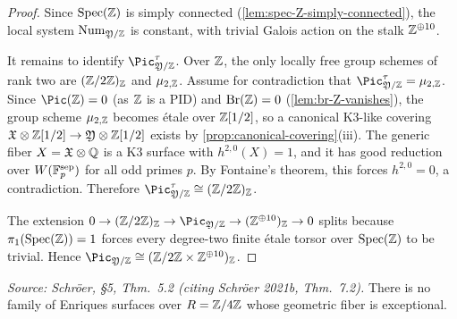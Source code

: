 \begin{proof}
  Since \(\mathrm{Spec}(\mathbb{Z})\) is simply connected (\cref{lem:spec-Z-simply-connected}), the local system
  \(\mathrm{Num}_{\mathfrak{Y}/\mathbb{Z}}\) is constant, with trivial Galois action on the stalk \(\mathbb{Z}^{\oplus 10}\).

  It remains to identify \(\Pic^{\tau}_{\foY/\ZZ}\).
  Over \(\mathbb{Z}\), the only locally free group schemes of rank two are \((\mathbb{Z}/2\mathbb{Z})_{\mathbb{Z}}\) and \(\mu_{2,\mathbb{Z}}\).
  Assume for contradiction that \(\Pic^{\tau}_{\foY/\ZZ} = \mu_{2,\ZZ}\).
  Since \(\Pic(\ZZ) = 0\) (as \(\mathbb{Z}\) is a PID) and \(\operatorname{Br}(\mathbb{Z}) = 0\) (\cref{lem:br-Z-vanishes}),
  the group scheme \(\mu_{2,\mathbb{Z}}\) becomes \'etale over \(\mathbb{Z}[1/2]\), so a canonical K3-like covering
  \(\mathfrak{X} \otimes \mathbb{Z}[1/2] \to \mathfrak{Y} \otimes \mathbb{Z}[1/2]\) exists by \cref{prop:canonical-covering}(iii).
  The generic fiber \(X = \mathfrak{X} \otimes \mathbb{Q}\) is a K3 surface with \(h^{2,0}(X) = 1\),
  and it has good reduction over \(W(\mathbb{F}_p^{\mathrm{sep}})\) for all odd primes \(p\).
  By Fontaine's theorem, this forces \(h^{2,0} = 0\), a contradiction.
  Therefore \(\Pic^{\tau}_{\foY/\ZZ} \cong (\ZZ/2\ZZ)_{\ZZ}\).

  The extension \(0 \to (\ZZ/2\ZZ)_{\ZZ} \to \Pic_{\foY/\ZZ} \to (\ZZ^{\oplus 10})_{\ZZ} \to 0\)
  splits because \(\pi_1(\mathrm{Spec}(\mathbb{Z})) = 1\) forces every degree-two finite étale torsor over \(\mathrm{Spec}(\mathbb{Z})\)
  to be trivial.
  Hence \(\Pic_{\foY/\ZZ} \cong (\ZZ/2\ZZ \times \ZZ^{\oplus 10})_{\ZZ}\).
\end{proof}

\begin{theorem}
  \label{thm:no-exceptional-over-Z4}
  \textit{Source: Schr\"oer, §5, Thm.~5.2 (citing Schr\"oer 2021b, Thm.~7.2).}
  There is no family of Enriques surfaces over \(R = \mathbb{Z}/4\mathbb{Z}\) whose geometric fiber is exceptional.
\end{theorem}

